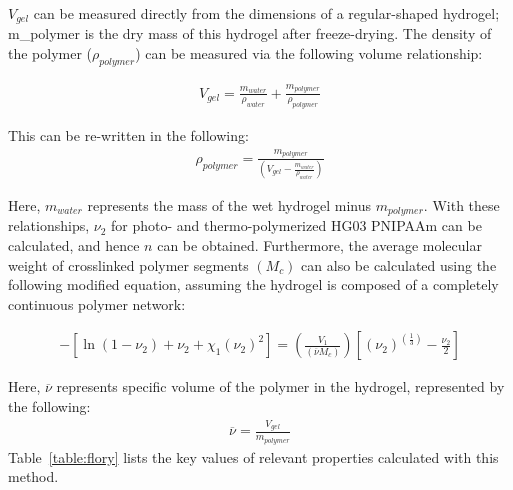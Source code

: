 $V_{gel}$ can be measured directly from the dimensions of a regular-shaped hydrogel; m_polymer is the dry mass of this hydrogel after freeze-drying. The density of the polymer ($\rho_{polymer}$) can be measured via the following volume relationship:

\begin{align}
	V_{gel}=\frac{m_{water}}{\rho_{water}} +\frac{m_{polymer}}{\rho_{polymer}} 
\end{align}

This can be re-written in the following:
\begin{align}
	\rho_{polymer}=\frac{m_{polymer}}{(V_{gel}-\frac{m_{water}}{\rho_{water}})}
\end{align}

Here, $m_{water}$ represents the mass of the wet hydrogel minus $m_{polymer}$. With these relationships, $\nu_{2}$ for photo- and thermo-polymerized HG03 PNIPAAm can be calculated, and hence $n$ can be obtained. Furthermore, the average molecular weight of crosslinked polymer segments $(M_{c})$ can also be calculated using the following modified equation, assuming the hydrogel is composed of a completely continuous polymer network:

\begin{align}
	-[\ln⁡(1-\nu_{2} )+\nu_{2}+\chi_{1} (\nu_{2} )^{2}]=(\frac{V_{1}}{(\overline{\nu} M_{c})})[(\nu_{2} )^{(\frac{1}{3})}-\frac{\nu_{2}}{2}]
\end{align}

Here, $\overline{\nu}$ represents specific volume of the polymer in the hydrogel, represented by the following:
\begin{align}
\overline{\nu}=\frac{V_{gel}}{m_{polymer}} 
\end{align}
Table~\ref{table:flory} lists the key values of relevant properties calculated with this method.

